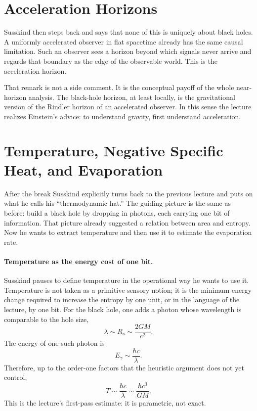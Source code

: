 \section{Acceleration Horizons}

Susskind then steps back and says that none of this is uniquely about black holes. A uniformly accelerated observer in flat spacetime already has the same causal limitation. Such an observer sees a horizon beyond which signals never arrive and regards that boundary as the edge of the observable world. This is the acceleration horizon.

That remark is not a side comment. It is the conceptual payoff of the whole near-horizon analysis. The black-hole horizon, at least locally, is the gravitational version of the Rindler horizon of an accelerated observer. In this sense the lecture realizes Einstein's advice: to understand gravity, first understand acceleration.

\section{Temperature, Negative Specific Heat, and Evaporation}

After the break Susskind explicitly turns back to the previous lecture and puts on what he calls his ``thermodynamic hat.'' The guiding picture is the same as before: build a black hole by dropping in photons, each carrying one bit of information. That picture already suggested a relation between area and entropy. Now he wants to extract temperature and then use it to estimate the evaporation rate.

\paragraph{Temperature as the energy cost of one bit.}
Susskind pauses to define temperature in the operational way he wants to use it. Temperature is not taken as a primitive sensory notion; it is the minimum energy change required to increase the entropy by one unit, or in the language of the lecture, by one bit. For the black hole, one adds a photon whose wavelength is comparable to the hole size,
\begin{equation}
\lambda \sim R_s \sim \frac{2GM}{c^2}.
\end{equation}
The energy of one such photon is
\begin{equation}
E_\gamma \sim \frac{\hbar c}{\lambda}.
\end{equation}
Therefore, up to the order-one factors that the heuristic argument does not yet control,
\begin{equation}
T \sim \frac{\hbar c}{\lambda} \sim \frac{\hbar c^3}{GM}.
\end{equation}
This is the lecture's first-pass estimate: it is parametric, not exact.

